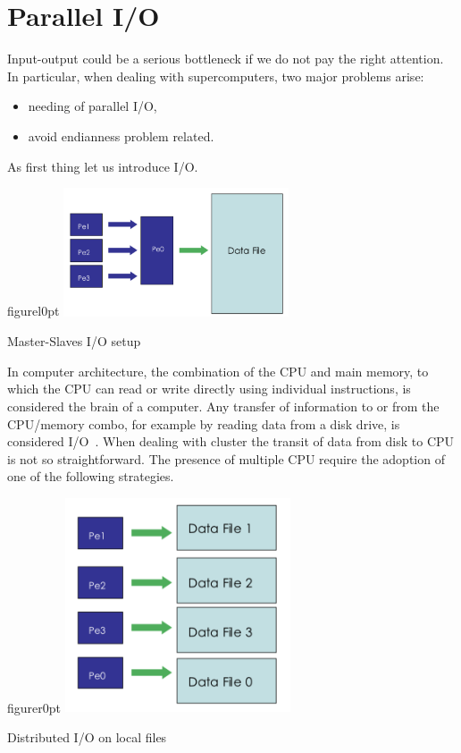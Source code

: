 \section{Parallel I/O}

Input-output could be a serious bottleneck if we do not pay the right attention.
In particular, when dealing with supercomputers, two major problems arise:
\begin{itemize}
\item needing of parallel I/O,
\item avoid endianness problem related.
\end{itemize}
As first thing let us introduce I/O.\par
\begin{wrapfloat}{figure}{l}{0pt}
\includegraphics[width=0.5\textwidth]{grafici/masterslave}
\caption{Master-Slaves I/O setup}
\end{wrapfloat}
In computer architecture, the combination of the CPU and main memory, to which the CPU can read or write directly using individual instructions, is considered the brain of a computer. Any transfer of information to or from the CPU/memory combo, for example by reading data from a disk drive, is considered I/O~\cite{io}.
When dealing with cluster the transit of data from disk to CPU is not so straightforward. The presence of multiple CPU require the adoption of one of the following strategies.\par
\begin{wrapfloat}{figure}{r}{0pt}
\includegraphics[width=0.5\textwidth]{grafici/localio}
\caption{Distributed I/O on local files}
\end{wrapfloat}
